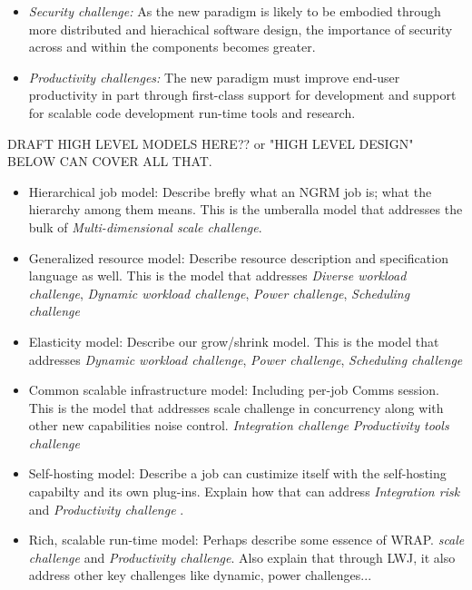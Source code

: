 \documentclass{article}
\begin{document}
\begin{itemize}
\item{\sl Security challenge:} As the new paradigm is likely to be 
     embodied through more distributed and hierachical software design, 
     the importance of security across and within the components becomes greater.

\item{\sl Productivity challenges:} The new paradigm must improve end-user 
     productivity in part through first-class support for development
     and support for scalable code development run-time tools and research.

\end{itemize}

DRAFT HIGH LEVEL MODELS HERE?? or "HIGH LEVEL DESIGN" BELOW CAN COVER ALL THAT. 

\begin{itemize}
\item{Hierarchical job model:} Describe brefly what an NGRM job is; what the hierarchy among them means. This is the umberalla model that addresses the bulk of {\sl Multi-dimensional scale challenge}.  

\item{Generalized resource model:} Describe resource description and specification language as well. This is the model that addresses {\sl Diverse workload challenge}, {\sl Dynamic workload challenge}, {\sl Power challenge}, {\sl Scheduling challenge}   

\item{Elasticity model:} Describe our grow/shrink model. This is the model that addresses {\sl Dynamic workload challenge}, {\sl Power challenge}, {\sl Scheduling challenge}

\item{Common scalable infrastructure model:} Including per-job Comms session. This is the model that addresses scale challenge in concurrency along with other new capabilities noise control. {\sl Integration challenge} {\sl Productivity tools challenge}

\item{Self-hosting model:} Describe a job can custimize itself with the self-hosting capabilty and its own plug-ins. Explain how that can address {\sl Integration risk} and {\sl Productivity challenge} . 

\item{Rich, scalable run-time model:} Perhaps describe some essence of WRAP. {\sl scale challenge} and {\sl Productivity challenge}.  Also explain that through LWJ, it also address other key challenges like dynamic, power challenges...  

\end{itemize}
\end{document}
